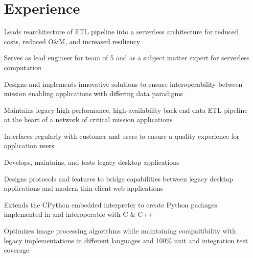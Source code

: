\documentclass[]{resume}
\begin{document}
\begin{minipage}[t]{0.69\textwidth}


\section{Experience}

\vspace{\topsep} %
\begin{tightemize}
\item Leads rearchitecture of ETL pipeline into a serverless architecture for reduced costs, reduced O\&M, and increased resiliency
\item Serves as lead engineer for team of 5 and as a subject matter expert for serverless computation
\item Designs and implements innovative solutions to ensure interoperability between mission enabling applications with differing data paradigms
\item Maintains legacy high-performance, high-availability back end data ETL pipeline at the heart of a network of critical mission applications
\item Interfaces regularly with customer and users to ensure a quality experience for application users
\end{tightemize}

\sectionsep

\begin{tightemize}
\item Develops, maintains, and tests legacy desktop applications
\item Designs protocols and features to bridge capabilities between legacy desktop applications and modern thin-client web applications
\item Extends the CPython embedded interpreter to create Python packages implemented in and interoperable with C \& C++
\item Optimizes image processing algorithms while maintaining compaitibility with legacy implementations in different languages and 100\% unit and integration test coverage
\end{tightemize}


\end{minipage}
\end{document}
